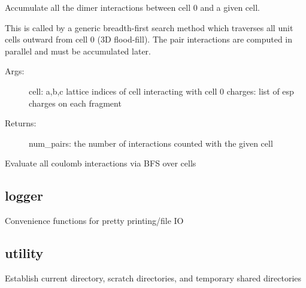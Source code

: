 \documentclass[letterpaper,10pt,english]{sphinxmanual}
\begin{document}
\begin{fulllineitems}
\label{\detokenize{globals:Globals.coulomb.coulomb_accumulator}}
Accumulate all the dimer interactions between cell 0 and a given cell.

This is called by a generic breadth-first search method which traverses all
unit cells outward from cell 0 (3D flood-fill).  The pair interactions are
computed in parallel and must be accumulated later.
\begin{description}
\item[{Args:}] \leavevmode
cell: a,b,c lattice indices of cell interacting with cell 0
charges: list of esp charges on each fragment

\item[{Returns:}] \leavevmode
num\_pairs: the number of interactions counted with the given cell

\end{description}

\end{fulllineitems}


\begin{fulllineitems}
\label{\detokenize{globals:Globals.coulomb.evaluate_coulomb}}
Evaluate all coulomb interactions via BFS over cells

\end{fulllineitems}



\subsection{logger}
\label{\detokenize{globals:logger}}\label{\detokenize{globals:module-Globals.logger}}
Convenience functions for pretty printing/file IO


\subsection{utility}
\label{\detokenize{globals:utility}}\label{\detokenize{globals:module-Globals.utility}}

\begin{fulllineitems}
\label{\detokenize{globals:Globals.utility.make_scratch_dirs}}
Establish current directory, scratch directories, and temporary shared
directories

\end{fulllineitems}
\end{document}
